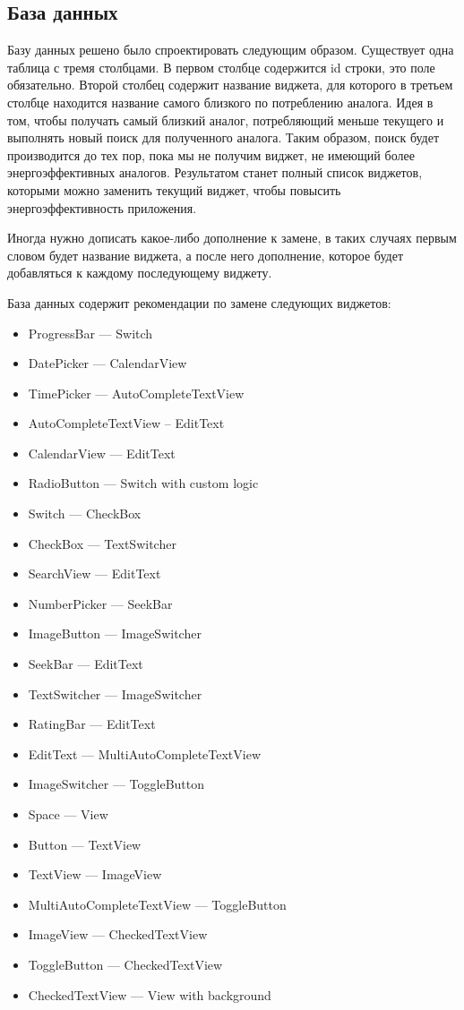 \documentclass[a4paper,14pt]{extarticle} %
\begin{document}
	\subsection{База данных}
	
	Базу данных решено было спроектировать следующим образом. Существует одна таблица с тремя столбцами. В первом столбце содержится id строки, это поле обязательно. Второй столбец содержит название виджета, для которого в третьем столбце находится название самого близкого по потреблению аналога. Идея в том, чтобы получать самый близкий аналог, потребляющий меньше текущего и выполнять новый поиск для полученного аналога. Таким образом, поиск будет производится до тех пор, пока мы не получим виджет, не имеющий более энергоэффективных аналогов. Результатом станет полный список виджетов, которыми можно заменить текущий виджет, чтобы повысить энергоэффективность приложения.
	
	Иногда нужно дописать какое-либо дополнение к замене, в таких случаях первым словом будет название виджета, а после него дополнение, которое будет добавляться к каждому последующему виджету.
	
	База данных содержит рекомендации по замене следующих виджетов:
	\begin{itemize}
		\item ProgressBar --- Switch
		\item DatePicker --- CalendarView
		\item TimePicker --- AutoCompleteTextView
		\item AutoCompleteTextView – EditText
		\item CalendarView --- EditText
		\item RadioButton --- Switch with custom logic
		\item Switch --- CheckBox
		\item CheckBox --- TextSwitcher
		\item SearchView --- EditText
		\item NumberPicker --- SeekBar
		\item ImageButton --- ImageSwitcher
		\item SeekBar --- EditText
		\item TextSwitcher --- ImageSwitcher
		\item RatingBar --- EditText
		\item EditText --- MultiAutoCompleteTextView
		\item ImageSwitcher --- ToggleButton
		\item Space --- View
		\item Button --- TextView
		\item TextView --- ImageView
		\item MultiAutoCompleteTextView --- ToggleButton
		\item ImageView --- CheckedTextView
		\item ToggleButton --- CheckedTextView
		\item CheckedTextView --- View with background
	\end{itemize}
\end{document}
